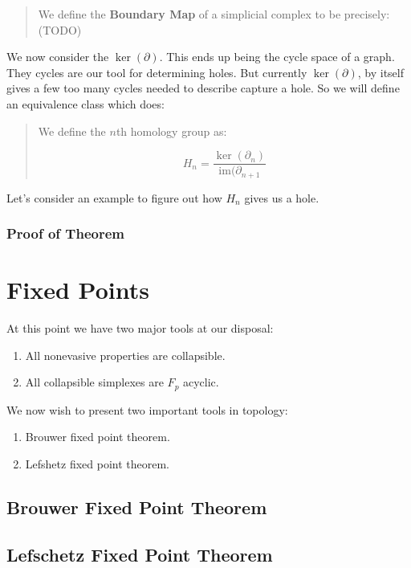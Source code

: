 \documentclass[letterpaper,12pt]{article}
\begin{document}
\begin{quote}
    We define the \textbf{Boundary Map} of a simplicial complex to be precisely: (TODO)
\end{quote}

We now consider the $\ker(\partial)$. This ends up being the cycle space of a graph. They cycles are our tool for determining holes. But currently $\ker(\partial)$, by itself gives a few too many cycles needed to describe capture a hole. So we will define an equivalence class which does:

\begin{quote}
    We define the $n$th homology group as:

    $$H_n = \frac{\ker(\partial_n)}{\text{im}(\partial_{n+1}}$$
\end{quote}

Let's consider an example to figure out how $H_n$ gives us a hole.

\begin{quote}
\end{quote}

\subsubsection{Proof of Theorem}

\section{Fixed Points}

At this point we have two major tools at our disposal:

\begin{enumerate}
    \item{
            All nonevasive properties are collapsible.
        }
    \item{
            All collapsible simplexes are $F_p$ acyclic.
        }
\end{enumerate}

We now wish to present two important tools in topology:

\begin{enumerate}
    \item{
            Brouwer fixed point theorem.
        }
    \item{
            Lefshetz fixed point theorem.
        }
\end{enumerate}

\subsection{Brouwer Fixed Point Theorem}

\subsection{Lefschetz Fixed Point Theorem}
\end{document}

